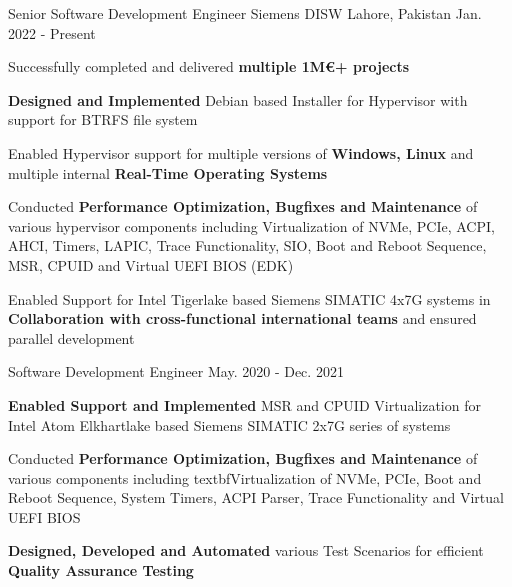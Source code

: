 

\begin{cventries}

  \cventry
    {Senior Software Development Engineer} %
    {Siemens DISW} %
    {Lahore, Pakistan} %
    {Jan. 2022 - Present} %
    {
      \begin{cvitems} %
        \item Successfully completed and delivered \textbf{multiple 1M€+ projects}
        \item \textbf{Designed and Implemented} Debian based Installer for Hypervisor with support for BTRFS file system
        \item Enabled Hypervisor support for multiple versions of \textbf{Windows, Linux} and multiple internal \textbf{Real-Time Operating Systems}
        \item Conducted \textbf{Performance Optimization, Bugfixes and Maintenance} of various hypervisor components including Virtualization of NVMe, PCIe, ACPI, AHCI, Timers, LAPIC, Trace Functionality, SIO, Boot and Reboot Sequence, MSR, CPUID and Virtual UEFI BIOS (EDK)
        \item Enabled Support for Intel Tigerlake based Siemens SIMATIC 4x7G systems in \textbf{Collaboration with cross-functional international teams} and ensured parallel development
      \end{cvitems}
    }

  \cventry
    {Software Development Engineer} %
    {} %
    {} %
    {May. 2020 - Dec. 2021} %
    {
      \begin{cvitems} %
        \item \textbf{Enabled Support and Implemented} MSR and CPUID Virtualization for Intel Atom Elkhartlake based Siemens SIMATIC 2x7G series of systems
        \item Conducted \textbf{Performance Optimization, Bugfixes and Maintenance} of various components including textbf{Virtualization} of NVMe, PCIe, Boot and Reboot Sequence, System Timers, ACPI Parser, Trace Functionality and Virtual UEFI BIOS
        \item \textbf{Designed, Developed and Automated} various Test Scenarios for efficient \textbf{Quality Assurance Testing}
      \end{cvitems}
    }


\end{cventries}
